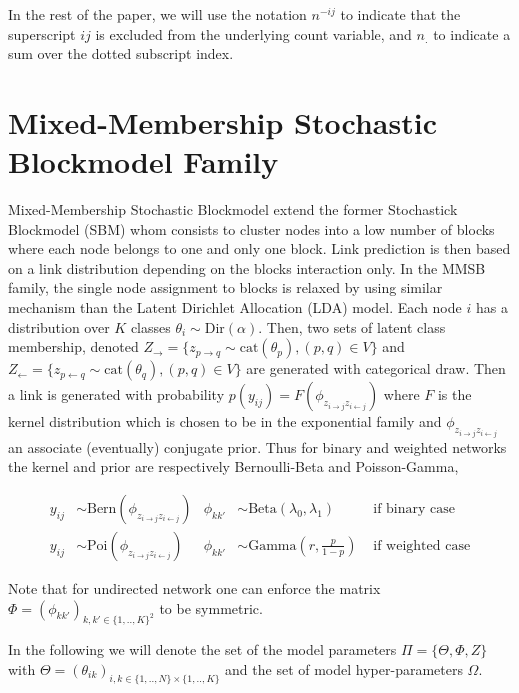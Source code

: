 In the rest of the paper, we will use the notation $n^{-ij}$ to indicate that the superscript $ij$ is excluded from the underlying count variable, and $n_{\bm{.}}$ to indicate a sum over the dotted subscript index.


\section{Mixed-Membership Stochastic Blockmodel Family}

Mixed-Membership Stochastic Blockmodel extend the former Stochastick Blockmodel (SBM) \cite{airoldi2009mixed} whom consists to cluster nodes into a low number of blocks where each node belongs to one and only one block. Link prediction is then based on a link distribution depending on the blocks interaction only. %
In the MMSB family, the single node assignment to blocks is relaxed by using similar mechanism than the Latent Dirichlet Allocation (LDA) model. Each node $i$ has a distribution over $K$ classes $\theta_i \sim \textrm{Dir}(\alpha)$. Then, two sets of latent class membership, denoted $Z_\rightarrow = \{z_{p\rightarrow q} \sim \textrm{cat}(\theta_p),  (p,q) \in V\}$ and $Z_\leftarrow = \{z_{p\leftarrow q} \sim \textrm{cat}(\theta_q),  (p,q) \in V\}$ are generated with categorical draw. Then a link is generated with probability $p(y_{ij}) = F(\phi_{z_{i \rightarrow j}z_{i \leftarrow j}})$ where $F$ is the kernel distribution which is chosen to be in the exponential family and $\phi_{z_{i \rightarrow j}z_{i \leftarrow j}}$ an associate (eventually) conjugate prior. Thus for binary and weighted networks the kernel and prior are respectively Bernoulli-Beta and Poisson-Gamma,

\begin{align*} \label{eq:generative}
y_{ij} &\sim \textrm{Bern}(\phi_{z_{i \rightarrow j}z_{i \leftarrow j}}) & \phi_{kk'} &\sim \textrm{Beta}(\lambda_0, \lambda_1) & \textrm{ if binary case} \\
y_{ij} &\sim \textrm{Poi}(\phi_{z_{i \rightarrow j}z_{i \leftarrow j}}) &  \phi_{kk'} &\sim \textrm{Gamma}(r, \frac{p}{1-p})    & \textrm{ if weighted case} 
\end{align*}

Note that for undirected network one can enforce the matrix $\Phi = (\phi_{kk'})_{k,k' \in \{1,..,K\}^2}$ to be symmetric.

In the following we will denote the set of the model parameters $\Pi = \{ \Theta, \Phi, Z \}$ with $\Theta = (\theta_{ik})_{i,k \in \{1,..,N\}\times \{1,..,K\}}$ and the set of model hyper-parameters $\Omega$.


